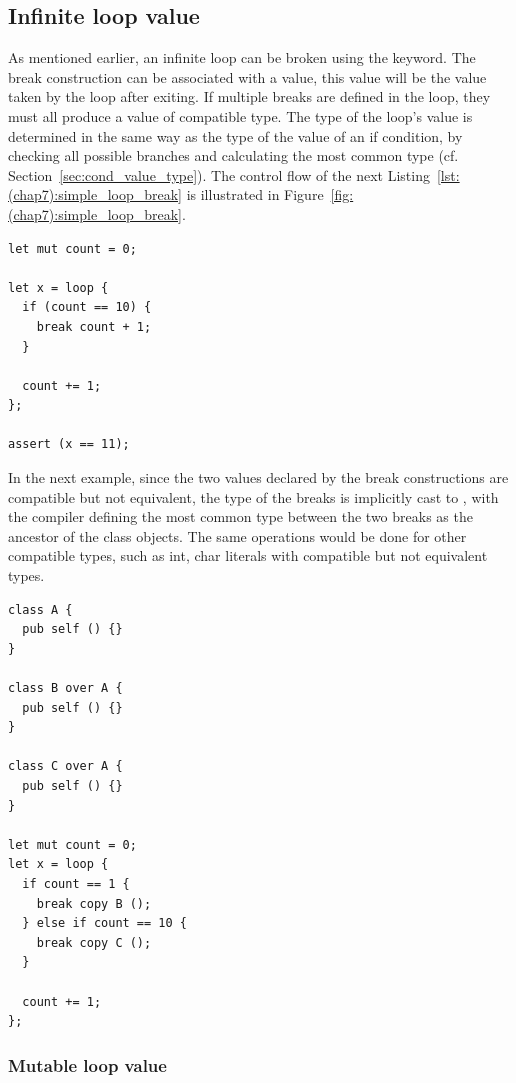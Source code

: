 \subsection {Infinite loop value}

As mentioned earlier, an infinite loop can be broken using the 
keyword. The break construction can be associated with a value, this value will
be the value taken by the loop after exiting. If multiple breaks are defined in
the loop, they must all produce a value of compatible type. The type of the
loop's value is determined in the same way as the type of the value of an if
condition, by checking all possible branches and calculating the most common
type (cf. Section~\ref{sec:cond_value_type}). The control flow of the next
Listing~\ref{lst:(chap7):simple_loop_break} is illustrated in
Figure~\ref{fig:(chap7):simple_loop_break}.

\begin{lstlisting}[style=coloredverbatim, label=lst:(chap7):simple_loop_break, caption=Breaking a loop with a value]
let mut count = 0;

let x = loop {
  if (count == 10) {
    break count + 1;
  }

  count += 1;
};

assert (x == 11);
\end{lstlisting}




In the next example, since the two values declared by the break
constructions are compatible but not equivalent, the type of the breaks is
implicitly cast to , with the compiler defining the most common type
between the two breaks as the ancestor of the class objects. The same operations
would be done for other compatible types, such as int, char literals with
compatible but not equivalent types.

\begin{lstlisting}[style=coloredverbatim, escapechar=@]
class A {
  pub self () {}
}

class B over A {
  pub self () {}
}

class C over A {
  pub self () {}
}

let mut count = 0;
let x = loop {
  if count == 1 {
    break copy B ();
  } else if count == 10 {
    break copy C ();
  }

  count += 1;
};
\end{lstlisting}


\subsubsection {Mutable loop value}


